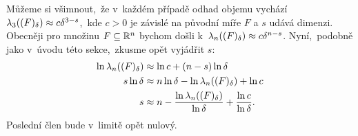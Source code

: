 Můžeme si všimnout,~že v~každém případě odhad objemu vychází $\lambda_3((F)_\delta)\approx c\delta^{3-s}$,~kde $c>0$ je závislé na původní míře $F$ a $s$ udává dimenzi. Obecněji pro množinu $F\subseteq\mathbb{R}^n$ bychom došli k~$\lambda_n((F)_\delta)\approx c\delta^{n-s}$. Nyní,~podobně jako v~úvodu této sekce,~zkusme opět vyjádřit $s$:
\begin{align*}
    \ln{\ensuremath{\lambda_n}((F)_\delta)}&\approx\ln{c}+(n-s)\ln{\delta}\\
    s\ln{\delta}&\approx n\ln{\delta}-\ln{\ensuremath{\lambda_n}((F)_\delta)}+\ln{c}\\
    s&\approx n-\dfrac{\ln{\ensuremath{\lambda_n}((F)_\delta)}}{\ln{\delta}}+\dfrac{\ln{c}}{\ln{\delta}}.
\end{align*}
Poslední člen bude v~limitě opět nulový.

